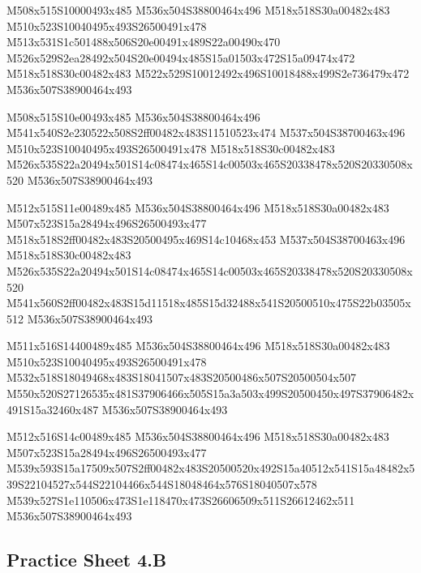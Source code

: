 \documentclass{article}
\begin{document}
\begin{multicols}{5}
\begin{center}

M508x515S10000493x485 %
M536x504S38800464x496 %
M518x518S30a00482x483 %
M510x523S10040495x493S26500491x478 %
M513x531S1c501488x506S20e00491x489S22a00490x470 %
M526x529S2ea28492x504S20e00494x485S15a01503x472S15a09474x472 %
M518x518S30c00482x483 %
M522x529S10012492x496S10018488x499S2e736479x472 %
M536x507S38900464x493 %
\vfil
\columnbreak

M508x515S10e00493x485 %
M536x504S38800464x496 %
M541x540S2e230522x508S2ff00482x483S11510523x474 %
M537x504S38700463x496 %
M510x523S10040495x493S26500491x478 %
M518x518S30c00482x483 %
M526x535S22a20494x501S14c08474x465S14c00503x465S20338478x520S20330508x520 %
M536x507S38900464x493 %
\vfil
\columnbreak

M512x515S11e00489x485 %
M536x504S38800464x496 %
M518x518S30a00482x483 %
M507x523S15a28494x496S26500493x477 %
M518x518S2ff00482x483S20500495x469S14c10468x453 %
M537x504S38700463x496 %
M518x518S30c00482x483 %
M526x535S22a20494x501S14c08474x465S14c00503x465S20338478x520S20330508x520 %
M541x560S2ff00482x483S15d11518x485S15d32488x541S20500510x475S22b03505x512 %
M536x507S38900464x493 %
\vfil
\columnbreak

M511x516S14400489x485 %
M536x504S38800464x496 %
M518x518S30a00482x483 %
M510x523S10040495x493S26500491x478 %
M532x518S18049468x483S18041507x483S20500486x507S20500504x507 %
M550x520S27126535x481S37906466x505S15a3a503x499S20500450x497S37906482x491S15a32460x487 %
M536x507S38900464x493 %
\vfil
\columnbreak

M512x516S14c00489x485 %
M536x504S38800464x496 %
M518x518S30a00482x483 %
M507x523S15a28494x496S26500493x477 %
M539x593S15a17509x507S2ff00482x483S20500520x492S15a40512x541S15a48482x539S22104527x544S22104466x544S18048464x576S18040507x578 %
M539x527S1e110506x473S1e118470x473S26606509x511S26612462x511 %
M536x507S38900464x493 %
\vfil

\end{center}
\end{multicols}

\subsection{Practice Sheet 4.B}
\end{document}
